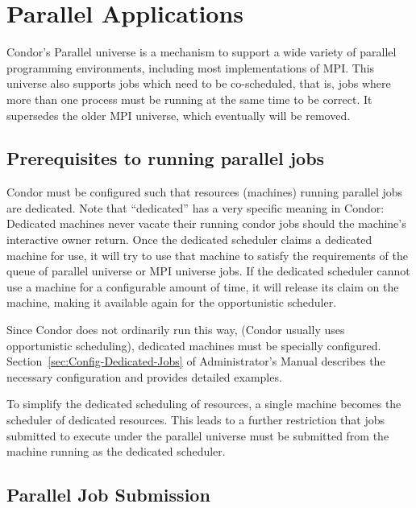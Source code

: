 \section{\label{sec:Parallel}Parallel Applications}

Condor's Parallel universe is a mechanism to support a wide variety of
parallel programming environments, including most implementations of
MPI.  This universe also supports jobs which need to be co-scheduled,
that is, jobs where more than one process must be running at the same
time to be correct.  It supersedes the older MPI universe, which
eventually will be removed.


\subsection{\label{sec:parallel-setup}Prerequisites to running parallel jobs}

Condor must be configured such that resources (machines) running
parallel jobs are dedicated.   Note that
``dedicated'' has a very specific meaning in Condor: Dedicated
machines never vacate their running condor jobs should the machine's
interactive owner return.  Once the dedicated scheduler claims a
dedicated machine for use, it will try to use that machine to satisfy
the requirements of the queue of parallel universe or MPI universe
jobs.  If the dedicated scheduler cannot use a machine for a
configurable amount of time, it will release its claim on the machine,
making it available again for the opportunistic scheduler.

Since Condor does not ordinarily run this way, (Condor usually uses
opportunistic scheduling), dedicated machines must be specially
configured.  Section~\ref{sec:Config-Dedicated-Jobs} of
Administrator's Manual describes the necessary configuration and
provides detailed examples.

To simplify the dedicated scheduling of resources, a single machine
becomes the scheduler of dedicated resources.  This leads to a further
restriction that jobs submitted to execute under the parallel universe
must be submitted from the machine running as the dedicated scheduler.

\subsection{\label{sec:parallel-submit}Parallel Job Submission}

